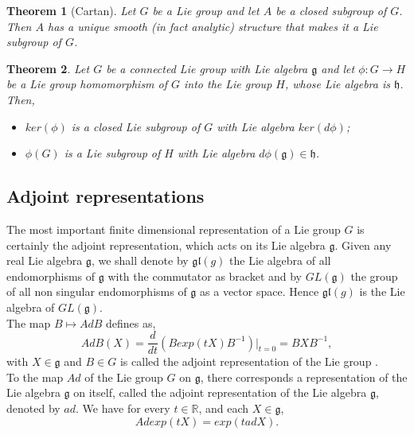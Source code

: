 \documentclass[a4paper,11pt]{article} %
\numberwithin{equation}{section} %
\numberwithin{figure}{section} %
\newtheorem{thm}{Theorem}
\begin{document}
\begin{thm}[Cartan] 
Let $G$ be a Lie group and let $A$ be a closed subgroup of $G$. Then $A$ has a unique smooth (in fact analytic) structure that makes it a Lie subgroup of $G$. 
\end{thm}

\begin{thm} 
Let $G$ be a connected Lie group  with Lie algebra $\mathfrak{g}$ and let $\phi:G\rightarrow H$ be a Lie group homomorphism of $G$ into the Lie group $H$, whose Lie
algebra is $\mathfrak{h}$. Then,
\begin{itemize}
\item[(i)] $ ker (\phi)$ is a closed Lie subgroup of $G$ with Lie algebra $ker (d\phi)$;
\item[(ii)] $\phi (G)$ is a Lie subgroup of $H$ with Lie algebra $d\phi (\mathfrak{g})\in \mathfrak{h}$.
\end{itemize}
\end{thm}

\subsection{Adjoint representations}

The most important finite dimensional representation of a Lie group $G$  is certainly the adjoint representation, which acts on its Lie algebra $\mathfrak{g}$. Given any real Lie algebra $\mathfrak{g}$, we shall denote by $\mathfrak{gl}(g)$ the Lie algebra of all endomorphisms of $\mathfrak{g}$ with the commutator as bracket and by $GL(\mathfrak{g})$ the group of all non singular endomorphisms of $\mathfrak{g}$ as a vector space. Hence $\mathfrak{gl}(g)$ is the Lie algebra of $GL(\mathfrak{g})$. \\
The map $B \mapsto Ad B$ defines as,
\begin{equation}
Ad B(X) = \frac{d}{dt} \left( B exp(tX) B^{-1} \right) \big|_{t=0} = B X B^{-1}, 
\end{equation}
with $X \in \mathfrak{g}$ and $B \in G$ is called the adjoint representation of the Lie group \cite[Def. 7.7, p.65]{Yvette2005}. \\
To the map $Ad$ of the Lie group $G$ on $\mathfrak{g}$, there corresponds a representation of the Lie algebra $\mathfrak{g}$ on itself, called the adjoint representation of the Lie algebra $\mathfrak{g}$, denoted by $ad$. We have for every $t \in \mathbb{R}$, and each $X \in \mathfrak{g}$, 
\begin{equation}
Ad exp(tX) = exp(t adX). 
\end{equation}
\end{document}
